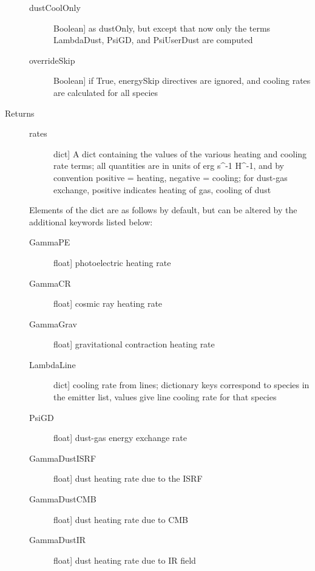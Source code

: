 \documentclass[letterpaper,10pt,english]{sphinxmanual}
\begin{document}
\begin{fulllineitems}
\begin{fulllineitems}
\begin{description}
\begin{description}
\item[{dustCoolOnly}] \leavevmode{[}Boolean{]}
as dustOnly, but except that now only the terms
LambdaDust, PsiGD, and PsiUserDust are computed

\item[{overrideSkip}] \leavevmode{[}Boolean{]}
if True, energySkip directives are ignored, and cooling
rates are calculated for all species

\end{description}

\item[{Returns}] \leavevmode\begin{description}
\item[{rates}] \leavevmode{[}dict{]}
A dict containing the values of the various heating and
cooling rate terms; all quantities are in units of erg s\textasciicircum{}-1
H\textasciicircum{}-1, and by convention positive = heating, negative =
cooling; for dust-gas exchange, positive indicates heating
of gas, cooling of dust

\end{description}

Elements of the dict are as follows by default, but can be
altered by the additional keywords listed below:
\begin{description}
\item[{GammaPE}] \leavevmode{[}float{]}
photoelectric heating rate

\item[{GammaCR}] \leavevmode{[}float{]}
cosmic ray heating rate

\item[{GammaGrav}] \leavevmode{[}float{]}
gravitational contraction heating rate

\item[{LambdaLine}] \leavevmode{[}dict{]}
cooling rate from lines; dictionary keys correspond to
species in the emitter list, values give line cooling
rate for that species

\item[{PsiGD}] \leavevmode{[}float{]}
dust-gas energy exchange rate

\item[{GammaDustISRF}] \leavevmode{[}float{]}
dust heating rate due to the ISRF

\item[{GammaDustCMB}] \leavevmode{[}float{]}
dust heating rate due to CMB

\item[{GammaDustIR}] \leavevmode{[}float{]}
dust heating rate due to IR field


\end{description}
\end{description}
\end{fulllineitems}
\end{fulllineitems}
\end{document}
